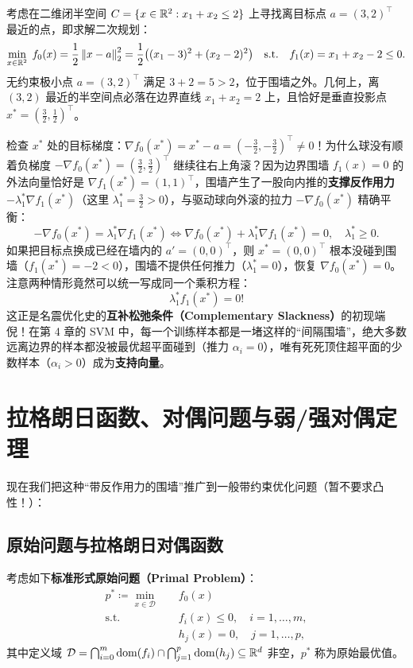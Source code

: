 \begin{example}\label{ex:v4-ch2-halfspace}
考虑在二维闭半空间 $C = \{x \in \mathbb{R}^2 : x_1 + x_2 \le 2\}$ 上寻找离目标点 $a = (3, 2)^\top$ 最近的点，即求解二次规划：
\[
  \min_{x \in \mathbb{R}^2}\; f_0(x) = \frac{1}{2}\left\|x - a\right\|_2^2 = \frac{1}{2}\big((x_1-3)^2 + (x_2-2)^2\big)
  \quad\text{s.t.}\quad f_1(x) = x_1 + x_2 - 2 \le 0.
\]
无约束极小点 $a = (3, 2)^\top$ 满足 $3+2=5 > 2$，位于围墙之外。几何上，离 $(3, 2)$ 最近的半空间点必落在边界直线 $x_1 + x_2 = 2$ 上，且恰好是垂直投影点 $x^* = \left(\frac{3}{2}, \frac{1}{2}\right)^\top$。

检查 $x^*$ 处的目标梯度：$\nabla f_0(x^*) = x^* - a = \left(-\frac{3}{2}, -\frac{3}{2}\right)^\top \neq 0$！为什么球没有顺着负梯度 $-\nabla f_0(x^*) = \left(\frac{3}{2}, \frac{3}{2}\right)^\top$ 继续往右上角滚？因为边界围墙 $f_1(x) = 0$ 的外法向量恰好是 $\nabla f_1(x^*) = (1, 1)^\top$，围墙产生了一股向内推的\textbf{支撑反作用力} $-\lambda_1^* \nabla f_1(x^*)$（这里 $\lambda_1^* = \frac{3}{2} > 0$），与驱动球向外滚的拉力 $-\nabla f_0(x^*)$ 精确平衡：
\[
  -\nabla f_0(x^*) = \lambda_1^* \nabla f_1(x^*) \iff \nabla f_0(x^*) + \lambda_1^* \nabla f_1(x^*) = 0,\quad \lambda_1^* \ge 0.
\]
如果把目标点换成已经在墙内的 $a' = (0, 0)^\top$，则 $x^* = (0, 0)^\top$ 根本没碰到围墙（$f_1(x^*) = -2 < 0$），围墙不提供任何推力（$\lambda_1^* = 0$），恢复 $\nabla f_0(x^*) = 0$。注意两种情形竟然可以统一写成同一个乘积方程：
\[
  \lambda_1^* f_1(x^*) = 0!
\]
这正是名震优化史的\textbf{互补松弛条件（Complementary Slackness）}的初现端倪！在第 4 章的 SVM 中，每一个训练样本都是一堵这样的“间隔围墙”，绝大多数远离边界的样本都没被最优超平面碰到（推力 $\alpha_i = 0$），唯有死死顶住超平面的少数样本（$\alpha_i > 0$）成为\textbf{支持向量}。
\end{example}

\section{拉格朗日函数、对偶问题与弱/强对偶定理}

现在我们把这种“带反作用力的围墙”推广到一般带约束优化问题（暂不要求凸性！）：

\subsection{原始问题与拉格朗日对偶函数}

考虑如下\textbf{标准形式原始问题（Primal Problem）}：
\begin{equation}\label{eq:v4-primal}
  \begin{aligned}
    p^* \coloneqq \min_{x \in \mathcal{D}} \quad & f_0(x) \\
    \text{s.t.} \quad & f_i(x) \le 0, \quad i = 1, \dots, m, \\
                      & h_j(x) = 0, \quad j = 1, \dots, p,
  \end{aligned}
\end{equation}
其中定义域 $\mathcal{D} = \bigcap_{i=0}^m \operatorname{dom}(f_i) \cap \bigcap_{j=1}^p \operatorname{dom}(h_j) \subseteq \mathbb{R}^d$ 非空，$p^*$ 称为原始最优值。

